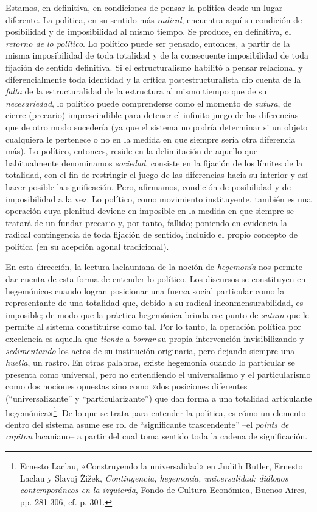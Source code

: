 Estamos, en definitiva, en condiciones de pensar la política desde un lugar diferente. La política, en su sentido más \emph{radical}, encuentra aquí su condición de posibilidad y de imposibilidad al mismo tiempo. Se produce, en definitiva, el \emph{retorno de lo político}. Lo político puede ser pensado, entonces, a partir de la misma imposibilidad de toda totalidad y de la consecuente imposibilidad de toda fijación de sentido definitiva. Si el estructuralismo habilitó a pensar relacional y diferencialmente toda identidad y la crítica postestructuralista dio cuenta de la \emph{falta} de la estructuralidad de la estructura al mismo tiempo que de su \emph{necesariedad}, lo político puede comprenderse como el momento de \emph{sutura}, de cierre (precario) imprescindible para detener el infinito juego de las diferencias que de otro modo sucedería (ya que el sistema no podría determinar si un objeto cualquiera le pertenece o no en la medida en que siempre sería otra diferencia más). Lo político, entonces, reside en la delimitación de aquello que habitualmente denominamos \emph{sociedad}, consiste en la fijación de los límites de la totalidad, con el fin de restringir el juego de las diferencias hacia su interior y así hacer posible la significación. Pero, afirmamos, condición de posibilidad y de imposibilidad a la vez. Lo político, como movimiento instituyente, también es una operación cuya plenitud deviene en imposible en la medida en que siempre se tratará de un fundar precario y, por tanto, fallido; poniendo en evidencia la radical contingencia de toda fijación de sentido, incluido el propio concepto de política (en su acepción agonal tradicional).

En esta dirección, la lectura laclauniana de la noción de \emph{hegemonía} nos permite dar cuenta de esta forma de entender lo político. Los discursos se constituyen en hegemónicos cuando logran posicionar una fuerza social particular como la representante de una totalidad que, debido a su radical inconmensurabilidad, es imposible; de modo que la práctica hegemónica brinda ese punto de \emph{sutura} que le permite al sistema constituirse como tal. Por lo tanto, la operación política por excelencia es aquella que \emph{tiende} a \emph{borrar} su propia intervención invisibilizando y \emph{sedimentando} los actos de su institución originaria, pero dejando siempre una \emph{huella}, un rastro. En otras palabras, existe hegemonía cuando lo particular se presenta como universal, pero no entendiendo el universalismo y el particularismo como dos nociones opuestas sino como «dos posiciones diferentes (``universalizante'' y ``particularizante'') que dan forma a una totalidad articulante hegemónica»\footnote{Ernesto Laclau, «Construyendo la universalidad» en Judith Butler, Ernesto Laclau y Slavoj Žižek, \emph{Contingencia, hegemonía, universalidad: diálogos contemporáneos en la izquierda}, Fondo de Cultura Económica, Buenos Aires, pp. 281-306, cf. p. 301.}. De lo que se trata para entender la política, es cómo un elemento dentro del sistema asume ese rol de ``significante trascendente'' --el \emph{points de capiton} lacaniano-- a partir del cual toma sentido toda la cadena de significación.


